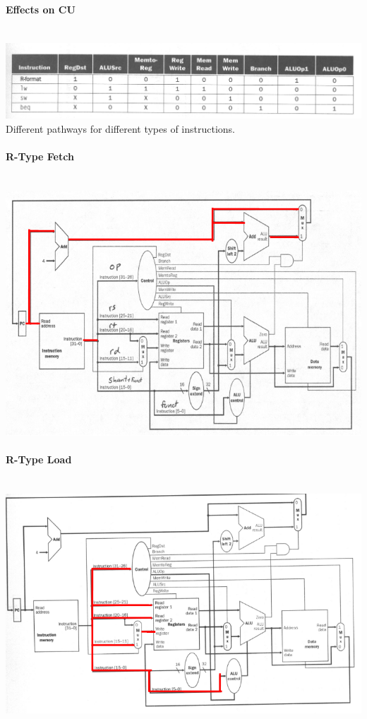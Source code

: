 \documentclass[12 pt]{article}
\begin{document}
	\paragraph{Effects on CU}
	~\\\includegraphics[scale=0.2]{cuo}
	\\ Different pathways for different types of instructions.
	\paragraph{R-Type Fetch}
	~\\ \includegraphics[scale=0.7]{rty}
	\paragraph{R-Type Load}~\\ \includegraphics[scale=0.7]{rtl}
\end{document}
